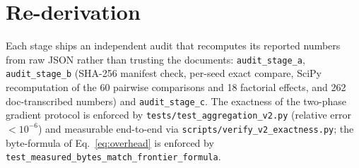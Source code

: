 \documentclass[11pt,a4paper]{report}
\begin{document}
\section{Re-derivation}
\label{sec:rederive}

Each stage ships an independent audit that recomputes its reported numbers
from raw JSON rather than trusting the documents: \texttt{audit\_stage\_a},
\texttt{audit\_stage\_b} (SHA-256 manifest check, per-seed exact compare,
SciPy recomputation of the 60 pairwise comparisons and 18 factorial
effects, and 262 doc-transcribed numbers) and \texttt{audit\_stage\_c}.
The exactness of
the two-phase gradient protocol is enforced by
\texttt{tests/test\_aggregation\_v2.py} (relative error $< 10^{-6}$) and
measurable end-to-end via \texttt{scripts/verify\_v2\_exactness.py}; the
byte-formula of Eq.~\eqref{eq:overhead} is enforced by
\texttt{test\_measured\_bytes\_match\_frontier\_formula}.
\end{document}
